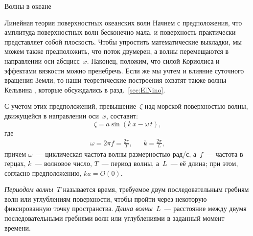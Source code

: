 \begin{chapter}{Волны в океане}
\begin{section}{Линейная теория поверхностных океанских волн}
Начнем с предположения, что амплитуда поверхностных волн бесконечно мала,
и поверхность практически представляет собой плоскость. Чтобы упростить
математические выкладки, мы можем также предположить, что поток двумерен,
а волны перемещаются в направлении оси абсцисс~$x$. Наконец, положим,
что силой Кориолиса и эффектами вязкости можно пренебречь.
Если же мы учтем и влияние суточного вращения Земли,
то наши теоретические построения охватят также волны Кельвина%
, которые обсуждались в разд.~\ref{sec:ElNino}.
%

С учетом этих предположений, превышение~$\zeta$ над морской поверхностью 
волны, движущейся в направлении оси~$x$, составит:
\begin{equation}
 \zeta = a \sin (k \, x - \omega \, t),
\end{equation}
где
\begin{eqnarray}
  \omega = 2 \pi f = \frac{2 \pi}{T}, & & k = \frac{2 \pi}{L},
\end{eqnarray}
причем $\omega$~--- циклическая частота волны размерностью рад/с,
а~$f$~--- частота в герцах, $k$~--- волновое число, 
$T$~--- период волны, а~$L$~--- её длина; при этом, согласно предположению,
$ka = O(0)$.
%

\emph{Периодом волны}~$T$ называется время,
требуемое двум последовательным гребням волн или углублениям поверхности,
чтобы пройти через некоторую фиксированную точку пространства.
\emph{Длина волны}~$L$~--- расстояние между двумя
последовательными гребнями волн или углублениями в заданный момент времени.
%


\end{section}
\end{chapter}
